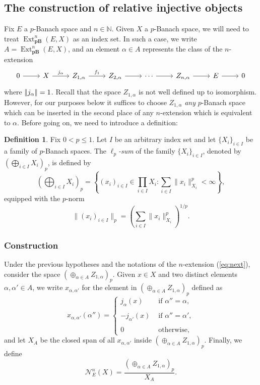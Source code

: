 \documentclass[12pt,a4paper]{amsproc}
\theoremstyle{remark}
\theoremstyle{definition}
\newtheorem{defi}[thm]{Definition}
\newcommand{\Ext}{\operatorname{Ext}}
\newcommand{\pBan}{\operatorname{\textbf{pB}}}
\newcommand{\norm}[1]{{\left\vert\kern-0.25ex\left\vert #1 
		\right\vert\kern-0.25ex\right\vert}}
\numberwithin{equation}{section}
\begin{document}
	\subsection{The construction of relative injective objects}
	\label{sec:relative-injective}
	Fix $E$ a $p$-Banach space and  $n\in \mathbb N$. Given $X$ a $p$-Banach space, we will need to treat $\Ext_{\pBan}^n(E,X)$ as an index set. In such a case, we write $A=\Ext_{\pBan}^n(E,X)$, and an element $\alpha \in A$ represents the class of the $n$-extension
	\begin{equation}
		\label{eq:next}
		\begin{tikzcd}
			0 \arrow[r] & X \arrow[r, "{j_\alpha}"] & {Z_{1,\alpha}} \arrow[r, "f_1"] & {Z_{2,\alpha}} \arrow[r] & \cdots \arrow[r] & {Z_{n,\alpha}} \arrow[r] & E \arrow[r] & 0
		\end{tikzcd}
	\end{equation}
	where $\norm{j_\alpha}=1$. Recall that the space $Z_{1,\alpha}$ is not well defined up to isomorphism. However, for our purposes below it suffices to choose $Z_{1,\alpha}$ \emph{any} $p$-Banach space which can be inserted in the second place of any $n$-extension which is equivalent to $\alpha$. Before going on, we need to introduce a definition:
\begin{defi}\label{def:lp_sum_infinite}
Fix $0 < p \le 1$. Let $I$ be an arbitrary index set and let $\{X_i\}_{i \in I}$ be a family of $p$-Banach spaces. The \emph{$\ell_p$-sum} of the family $\{X_i\}_{i \in I}$, denoted by $\left(\bigoplus_{i \in I} X_i\right)_{p}$, is defined by
\[
	\left(\bigoplus_{i \in I} X_i\right)_{p} = \left\{ (x_i)_{i \in I} \in \prod_{i \in I} X_i : \sum_{i \in I} \|x_i\|_{X_i}^p < \infty \right\},
\]
equipped with the $p$-norm
\[
	\|(x_i)_{i \in I}\|_p = \left( \sum_{i \in I} \|x_i\|_{X_i}^p \right)^{1/p}.
\]
\end{defi}
	\subsubsection*{Construction} Under the previous hypotheses and the notations of the $n$-extension (\ref{eq:next}), consider the space $\left(\oplus_{\alpha \in A} Z_{1,\alpha}\right)_p$. Given $x \in X$ and two distinct elements
	$\alpha, \alpha'\in A$, we write 
	$x_{\alpha, \alpha'}$ for the element in $\left(\oplus_{\alpha \in A} Z_{1,\alpha}\right)_p$ defined as
	$$x_{\alpha, \alpha'}(\alpha'')= \left\{ \begin{array}{cl}
		j_\alpha(x) &   \text{ if } \alpha''=\alpha, \\
		\\ -j_{\alpha'}(x) &  \text{ if }  \alpha''=\alpha', \\
		\\ 0 &  \text{ otherwise,}
	\end{array}
	\right.
	$$
	and let $X_A$ be the closed span of all $x_{\alpha, \alpha'}$ inside $\left(\oplus_{\alpha \in A} Z_{1,\alpha}\right)_p$. Finally, we define
	$$\mathcal{N}_E^n(X)=\frac{\left(\oplus_{\alpha \in A} Z_{1,\alpha}\right)_p}{X_A}.$$
	
\end{document}
